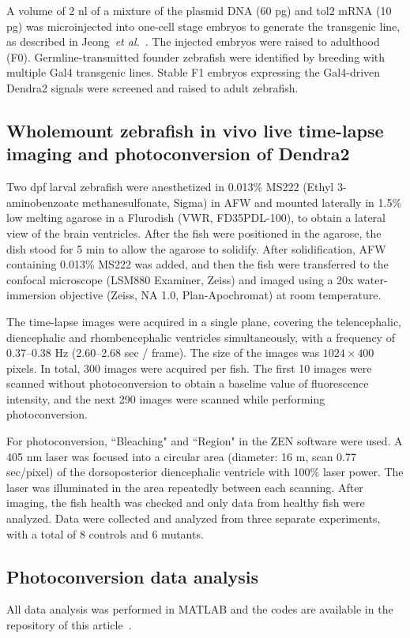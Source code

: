 \documentclass{WileyMSP-template}
\begin{document}
A volume of 2 nl of a mixture of the plasmid DNA (60 pg) and tol2 mRNA (10 pg)
was microinjected into one-cell stage embryos to generate the transgenic line,
as described in Jeong~\emph{et al.}~\cite{Jeong2024TheZebrafish}. The injected
embryos were raised to adulthood (F0).
Germline-transmitted founder zebrafish were identified by breeding with
multiple Gal4 transgenic lines. Stable F1 embryos expressing the Gal4-driven
Dendra2 signals were screened and raised to adult zebrafish.

\subsection{Wholemount zebrafish in vivo live time-lapse imaging and photoconversion of Dendra2}
Two dpf larval zebrafish were anesthetized in 0.013\% MS222
(Ethyl 3-aminobenzoate methanesulfonate, Sigma) in AFW and
mounted laterally in 1.5\% low melting agarose in a Flurodish (VWR, FD35PDL-100),
to obtain a lateral view of the brain ventricles. After the
fish were positioned in the agarose, the dish stood for 5 min to allow the agarose to solidify.
After solidification, AFW containing 0.013\% MS222 was added,
and then the fish were transferred to the confocal microscope (LSM880 Examiner, Zeiss)
and imaged using a 20x water-immersion objective (Zeiss, NA 1.0, Plan-Apochromat)
at room temperature.

The time-lapse images were acquired in a single plane, covering the
telencephalic, diencephalic and rhombencephalic ventricles simultaneously,
with a frequency of 0.37--0.38 Hz (2.60--2.68 sec / frame). The size
of the images was $1024\times400$ pixels. In total, 300 images were acquired per fish.
The first 10 images were scanned without photoconversion to obtain a
baseline value of fluorescence intensity, and the next 290 images were
scanned while performing photoconversion. 

For photoconversion, ``Bleaching" and ``Region" in the ZEN software
were used. A 405 nm laser was focused into a circular area (diameter: 16 \textmu m, scan 0.77 \textmu sec/pixel)
of the dorsoposterior diencephalic ventricle with 100\% laser power.
The laser was illuminated in the area repeatedly between each scanning.
After imaging, the fish health was checked and only data from healthy fish were analyzed.
Data were collected and analyzed from three separate experiments,
with a total of 8 controls and 6 mutants.

\subsection{Photoconversion data analysis}
All data analysis was performed in MATLAB and the codes are available in
the repository of this article~\cite{zenodo-link-to-all-code}.
\end{document}
